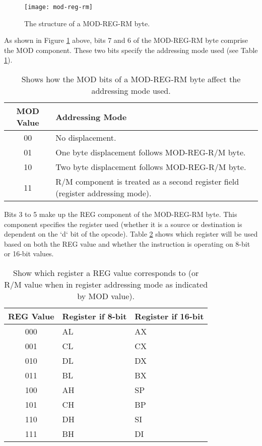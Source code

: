		\begin{figure}[h]
			\centering
			\texttt{[image: mod-reg-rm]}
			\caption{The structure of a MOD-REG-RM byte.}
			\label{figure:mod-reg-rm}
		\end{figure}

		As shown in Figure \ref{figure:mod-reg-rm} above, bits 7 and 6 of the MOD-REG-RM byte comprise the MOD component. These two bits specify the addressing mode used (see Table \ref{table:mod-addressing-mode}).

		\begin{table}[h]
			\centering
			\begin{tabular} { | c | m{} | }
				\hline
				MOD Value & Addressing Mode \\
				\hline
				00	& No displacement. \\
				01	& One byte displacement follows MOD-REG-R/M byte. \\
				10	& Two byte displacement follows MOD-REG-R/M byte. \\
				11	& R/M component is treated as a second register field (register addressing mode). \\
				\hline
			\end{tabular}
			\caption{Shows how the MOD bits of a MOD-REG-RM byte affect the addressing mode used.}
			\label{table:mod-addressing-mode}
		\end{table}

		Bits 3 to 5 make up the REG component of the MOD-REG-RM byte. This component specifies the register used (whether it is a source or destination is dependent on the `d` bit of the opcode). Table \ref{table:reg-addressing} shows which register will be used based on both the REG value and whether the instruction is operating on 8-bit or 16-bit values.

		\begin{table}[h]
			\centering
			\begin{tabular} { | c | m{0.1\textwidth} | m{} | }
				\hline
				REG Value & Register if 8-bit & Register if 16-bit \\
				\hline
				000 & AL & AX \\
				001 & CL & CX \\
				010 & DL & DX \\
				011 & BL & BX \\
				100 & AH & SP \\
				101 & CH & BP \\
				110 & DH & SI \\
				111 & BH & DI \\
				\hline
			\end{tabular}
			\caption{Show which register a REG value corresponds to (or R/M value when in register addressing mode as indicated by MOD value).}
			\label{table:reg-addressing}
		\end{table}

